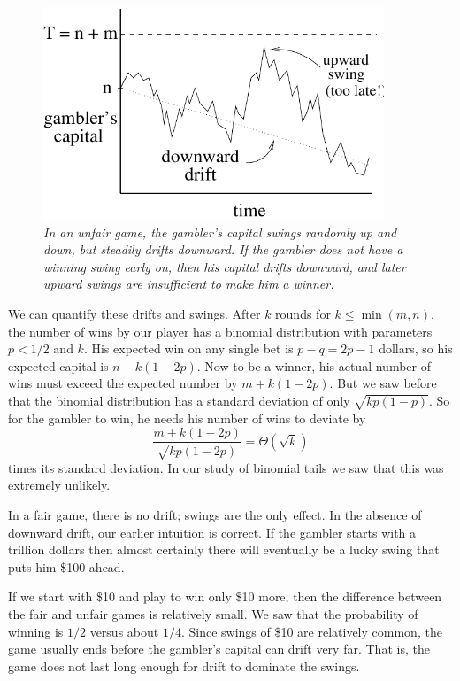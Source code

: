 \begin{example}
\begin{figure}
\centerline{\includegraphics[height=2.5in]{figures/walk2}}
\caption{\em In an unfair game, the gambler's capital swings randomly up
and down, but steadily drifts downward.  If the gambler does not have
a winning swing early on, then his capital drifts downward, and later
upward swings are insufficient to make him a winner.}
\label{LN12:fig:walk2}
\end{figure}

\iffalse

We can quantify these drifts and swings.  After $k$ rounds for $k \le
\min(m,n)$, the number of wins by our player has a binomial distribution
with parameters $p < 1/2$ and $k$.  His expected win on any single bet is
$p-q = 2p-1$ dollars, so his expected capital is $n-k(1-2p)$.  Now to be a
winner, his actual number of wins must exceed the expected number by
$m+k(1-2p)$.  But we saw before that the binomial distribution has a
standard deviation of only $\sqrt{kp(1-p)}$.  So for the gambler to win,
he needs his number of wins to deviate by
\[
\frac{m+k(1-2p)}{\sqrt{kp(1-2p)}}=\Theta(\sqrt{k})
\]
times its standard deviation.  In our study of binomial tails we saw that
this was extremely unlikely.

In a fair game, there is no drift; swings are the only effect.  In the
absence of downward drift, our earlier intuition is correct.  If the
gambler starts with a trillion dollars then almost certainly there
will eventually be a lucky swing that puts him \$100 ahead.

If we start with \$10 and play to win only \$10 more, then the difference
between the fair and unfair games is relatively small. We saw that the
probability of winning is $1/2$ versus about $1/4$.  Since swings of \$10
are relatively common, the game usually ends before the gambler's capital
can drift very far.  That is, the game does not last long enough for drift
to dominate the swings.


\end{example}
